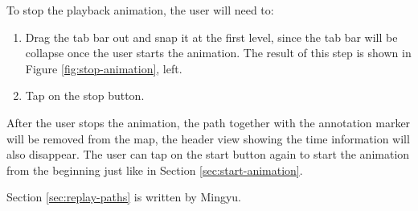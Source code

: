 \documentclass[12pt,a4paper]{article}
\begin{document}
                To stop the playback animation, the user will need to:
                \begin{enumerate}
                    \item Drag the tab bar out and snap it at the first level, since the tab bar will be collapse once the user starts the animation. The result of this step is shown in Figure \ref{fig:stop-animation}, left.
                    \item Tap on the stop button.
                \end{enumerate}
                
                After the user stops the animation, the path together with the annotation marker will be removed from the map, the header view showing the time information will also disappear. The user can tap on the start button again to start the animation from the beginning just like in Section \ref{sec:start-animation}.
            
            \footnotesize
            Section \ref{sec:replay-paths} is written by Mingyu.
            \normalsize
        \clearpage
        
\end{document}
